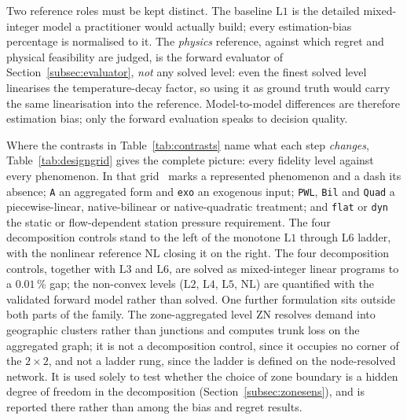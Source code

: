 \documentclass[a4paper,fleqn]{cas-sc}
\newcommand{\ZN}{\ensuremath{\mathrm{ZN}}}      %
\newcommand{\Lone}{\ensuremath{\mathrm{L1}}}    %
\newcommand{\Ltwo}{\ensuremath{\mathrm{L2}}}    %
\newcommand{\Lthree}{\ensuremath{\mathrm{L3}}}  %
\newcommand{\Lfour}{\ensuremath{\mathrm{L4}}}   %
\newcommand{\Lfive}{\ensuremath{\mathrm{L5}}}   %
\newcommand{\Lsix}{\ensuremath{\mathrm{L6}}}    %
\newcommand{\NLref}{\ensuremath{\mathrm{NL}}}   %
\begin{document}
Two reference roles must be kept distinct. The baseline $\Lone$ is the detailed
mixed-integer model a practitioner would actually build; every estimation-bias percentage is
normalised to it. The \emph{physics} reference, against which regret and physical feasibility
are judged, is the forward evaluator of Section~\ref{subsec:evaluator}, \emph{not} any solved
level: even the finest solved level linearises the temperature-decay factor, so using it as
ground truth would carry the same linearisation into the reference. Model-to-model differences
are therefore estimation bias; only the forward evaluation speaks to decision quality.


Where the contrasts in Table~\ref{tab:contrasts} name what each step \emph{changes},
Table~\ref{tab:designgrid} gives the complete picture: every fidelity level against every
phenomenon. In that grid \checkmark\ marks a represented phenomenon and a dash its absence;
\texttt{A} an aggregated form and \texttt{exo} an exogenous input; \texttt{PWL}, \texttt{Bil}
and \texttt{Quad} a piecewise-linear, native-bilinear or native-quadratic treatment; and
\texttt{flat} or \texttt{dyn} the static or flow-dependent station pressure requirement. The
four decomposition controls stand to the left of the monotone $\Lone$ through $\Lsix$ ladder,
with the nonlinear reference $\NLref$ closing it on the right.
The four decomposition controls, together with $\Lthree$ and $\Lsix$, are solved as
mixed-integer linear programs to a $0.01$\,\% gap; the non-convex levels
($\Ltwo$, $\Lfour$, $\Lfive$, $\NLref$) are quantified with the validated forward model
rather than solved. 
One further formulation sits outside both parts of the family. The zone-aggregated level
$\ZN$ resolves demand into geographic clusters rather than junctions and computes trunk
loss on the aggregated graph; it is not a decomposition control, since it occupies no
corner of the $2\times2$, and not a ladder rung, since the ladder is defined on the
node-resolved network. It is used solely to test whether the choice of zone boundary is a
hidden degree of freedom in the decomposition (Section~\ref{subsec:zonesens}), and is
reported there rather than among the bias and regret results.

\end{document}
